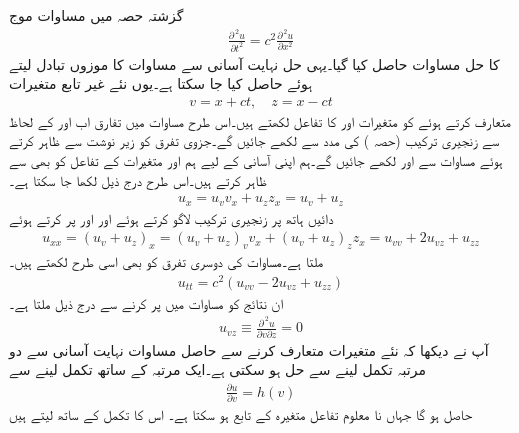 گزشتہ حصہ میں مساوات موج
\begin{align}\label{مساوات_جزوی_موج_مساوات_الف}
\frac{\partial^{\,2}u}{\partial t^2}=c^2\frac{\partial^{\,2}u}{\partial x^2}
\end{align}
کا حل مساوات  حاصل کیا گیا۔یہی حل نہایت آسانی سے مساوات  کا موزوں تبادل لیتے ہوئے حاصل کیا جا سکتا ہے۔یوں نئے غیر تابع متغیرات
\begin{align}\label{مساوات_جزوی_موج_مساوات_ب}
v=x+ct,\quad z=x-ct
\end{align}
متعارف کرتے ہوئے  کو متغیرات  اور  کا تفاعل لکھتے ہیں۔اس طرح مساوات  میں تفارق اب  اور  کے لحاظ سے زنجیری ترکیب (حصہ )  کی مدد سے لکھے جائیں گے۔جزوی تفرق کو زیر نوشت سے ظاہر کرتے ہوئے  مساوات  سے  اور  لکھے جائیں گے۔ہم اپنی آسانی کے لیے ہم  اور  متغیرات کے تفاعل کو بھی  سے ظاہر کرتے ہیں۔اس طرح درج ذیل لکھا جا سکتا ہے۔
\begin{align*}
u_x=u_vv_x+u_zz_x=u_v+u_z
\end{align*}
دائیں ہاتھ پر زنجیری ترکیب لاگو کرتے ہوئے اور  اور  پر کرتے ہوئے
\begin{align*}
u_{xx}=(u_v+u_z)_x=(u_v+u_z)_vv_x+(u_v+u_z)_zz_x=u_{vv}+2u_{vz}+u_{zz}
\end{align*}
ملتا ہے۔مساوات  کی دوسری تفرق کو بھی اسی طرح لکھتے ہیں۔
\begin{align*}
u_{tt}=c^2(u_{vv}-2u_{vz}+u_{zz})
\end{align*}
ان نتائج کو مساوات  میں پر کرنے سے درج ذیل ملتا ہے۔
\begin{align}\label{مساوات_جزوی_موج_مساوات_پ}
u_{vz}\equiv \frac{\partial^{\,2}u}{\partial v\partial z}=0
\end{align}
آپ نے دیکھا کہ نئے متغیرات متعارف کرنے سے حاصل مساوات  نہایت آسانی سے دو مرتبہ تکمل لینے سے حل ہو سکتی ہے۔ایک مرتبہ  کے ساتھ تکمل لینے سے
\begin{align*}
\frac{\partial u}{\partial v}=h(v)
\end{align*}
حاصل ہو گا جہاں نا معلوم تفاعل  متغیرہ  کے تابع ہو سکتا ہے۔ اس کا تکمل  کے ساتھ لیتے ہیں
